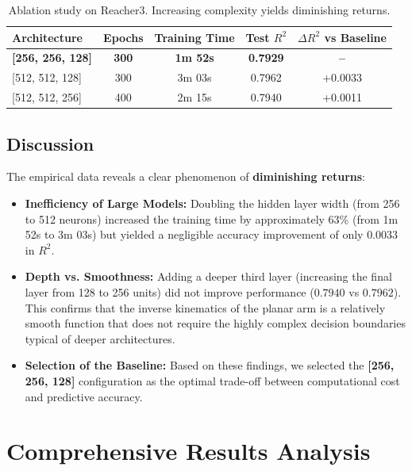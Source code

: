 \documentclass[a4paper,11pt]{article}
\begin{document}
\begin{table}[h]
    \centering
    \label{tab:reacher3_experiments}
    \begin{tabular}{lcccc}
        \toprule
        \textbf{Architecture} & \textbf{Epochs} & \textbf{Training Time} & \textbf{Test $R^{2}$} & \textbf{$\Delta R^2$ vs Baseline} \\
        \midrule
        \textbf{[256, 256, 128]} & \textbf{300} & \textbf{1m 52s} & \textbf{0.7929} & \textbf{--} \\
        {[}512, 512, 128{]} & 300 & 3m 03s & 0.7962 & +0.0033 \\
        {[}512, 512, 256{]} & 400 & 2m 15s & 0.7940 & +0.0011 \\
        \bottomrule
    \end{tabular}
    \caption{Ablation study on Reacher3. Increasing complexity yields diminishing returns.}
\end{table}

\subsection{Discussion}
The empirical data reveals a clear phenomenon of \textbf{diminishing returns}:

\begin{itemize}
    \item \textbf{Inefficiency of Large Models:} Doubling the hidden layer width (from 256 to 512 neurons) increased the training time by approximately 63\% (from 1m 52s to 3m 03s) but yielded a negligible accuracy improvement of only $0.0033$ in $R^2$.
    \item \textbf{Depth vs. Smoothness:} Adding a deeper third layer (increasing the final layer from 128 to 256 units) did not improve performance ($0.7940$ vs $0.7962$). This confirms that the inverse kinematics of the planar arm is a relatively smooth function that does not require the highly complex decision boundaries typical of deeper architectures.
    \item \textbf{Selection of the Baseline:} Based on these findings, we selected the \textbf{[256, 256, 128]} configuration as the optimal trade-off between computational cost and predictive accuracy.
\end{itemize}


\section{Comprehensive Results Analysis}
\end{document}
